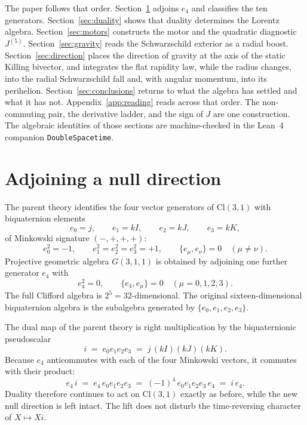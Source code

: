 \documentclass[a4paper]{article}
\begin{document}
The paper follows that order. Section~\ref{sec:adjunction} adjoins \(e_{4}\) and classifies the ten generators. Section~\ref{sec:duality} shows that duality determines the Lorentz algebra. Section~\ref{sec:motors} constructs the motor and the quadratic diagnostic \(J^{(5)}\). Section~\ref{sec:gravity} reads the Schwarzschild exterior as a radial boost. Section~\ref{sec:direction} places the direction of gravity at the axis of the static Killing bivector, and integrates the flat rapidity law, while the radius changes, into the radial Schwarzschild fall and, with angular momentum, into its perihelion. Section~\ref{sec:conclusions} returns to what the algebra has settled and what it has not. Appendix~\ref{app:reading} reads across that order. The non-commuting pair, the derivative ladder, and the sign of \(J\) are one construction. The algebraic identities of those sections are machine-checked in the Lean~4 companion \texttt{DoubleSpacetime}.

\section{Adjoining a null direction}
\label{sec:adjunction}

The parent theory identifies the four vector generators of \(\mathrm{Cl}(3,1)\) with biquaternion elements
\[
e_{0}=j,\qquad e_{1}=kI,\qquad e_{2}=kJ,\qquad e_{3}=kK,
\]
of Minkowski signature \((-,+,+,+)\):
\[
e_{0}^{2}=-1,\qquad e_{1}^{2}=e_{2}^{2}=e_{3}^{2}=+1,\qquad \{e_{\mu},e_{\nu}\}=0\quad(\mu\neq\nu).
\]
Projective geometric algebra \(G(3,1,1)\) is obtained by adjoining one further generator \(e_{4}\) with
\begin{equation}
e_{4}^{2}=0,\qquad \{e_{4},e_{\mu}\}=0\quad(\mu=0,1,2,3).
\label{eq:e4-defs}
\end{equation}
The full Clifford algebra is \(2^{5}=32\)-dimensional. The original sixteen-dimensional biquaternion algebra is the subalgebra generated by \(\{e_{0},e_{1},e_{2},e_{3}\}\).

The dual map of the parent theory is right multiplication by the biquaternionic pseudoscalar~\cite{ConwaySmith2003}
\[
i \;=\; e_{0}e_{1}e_{2}e_{3} \;=\; j\,(kI)(kJ)(kK).
\]
Because \(e_{4}\) anticommutes with each of the four Minkowski vectors, it commutes with their product:
\[
e_{4}\,i \;=\; e_{4}\,e_{0}e_{1}e_{2}e_{3} \;=\; (-1)^{4}\,e_{0}e_{1}e_{2}e_{3}\,e_{4} \;=\; i\,e_{4}.
\]
Duality therefore continues to act on \(\mathrm{Cl}(3,1)\) exactly as before, while the new null direction is left intact. The lift does not disturb the time-reversing character of \(X\mapsto Xi\).
\end{document}
